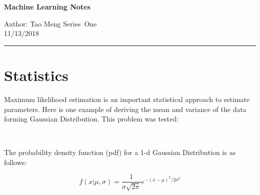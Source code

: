 \documentclass[14pt]{article}
\begin{document}
\thispagestyle{empty}


\begin{center}
\bf\large Machine Learning Notes
\end{center}

\noindent
Author: Tao Meng  %
\hfill
Series\ One              %
\\
\hfill
11/13/2018                         %

\noindent
\rule{\textwidth}{1pt}

\medskip


\section*{Statistics}
\begin{flushleft}
Maximum likelihood estimation is an important statistical approach to estimate parameters. Here is one example of deriving the
mean and variance of the data forming Gaussian Distribution. This problem was tested: \par
\ \par
The probability density function (pdf) for a 1-d Gaussian Distribution is as follows:\par\par
\begin{equation}
f(x | \mu,\sigma) = \frac{1}{{\sigma \sqrt{2\pi } }} e^{ {- \left( x - \mu \right)^2 } / { 2 \sigma^2} } 
\end{equation}









\end{flushleft}
\end{document}
